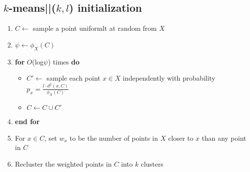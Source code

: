 \documentclass[fontsize=11pt]{scrartcl}
\numberwithin{equation}{section}
\numberwithin{figure}{section}
\numberwithin{table}{section}
\begin{document}

\subsection*{\textbf{$k$-means||($k,l$) initialization}}
\begin{enumerate}
	\item $C \leftarrow$ sample a point uniformlt at random from $X$ 
	\item $\psi \leftarrow \phi_X(C)$
	\item \textbf{for} $O$(log$\psi$) times \textbf{do}
		\begin{itemize}
		\item $C' \leftarrow$ sample each point $x \in X$ independently with probability $p_x = \frac{l \cdot d^2(x,C)}{\phi_X(C)}$	
		\item $C \leftarrow C \cup C'$ 
		\end{itemize}
	\item \textbf{end for} 
	\item For $x \in C$, set $w_x$ to be the number of points in $X$ closer to $x$ than any point in $C$ 
		\item Recluster the weighted points in $C$ into $k$ clusters
\end{enumerate}

\end{document}
